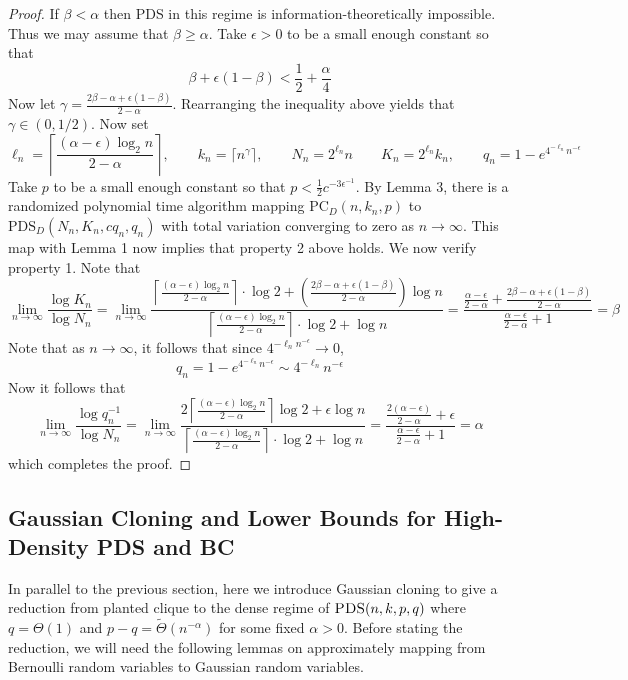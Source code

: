 \documentclass[11pt]{article}
\begin{document}
\begin{proof}
If $\beta < \alpha$ then PDS in this regime is information-theoretically impossible. Thus we may assume that $\beta \ge \alpha$. Take $\epsilon > 0$ to be a small enough constant so that
$$\beta + \epsilon(1 - \beta) < \frac{1}{2} + \frac{\alpha}{4}$$
Now let $\gamma = \frac{2\beta - \alpha + \epsilon(1 - \beta)}{2 - \alpha}$. Rearranging the inequality above yields that $\gamma \in (0, 1/2)$. Now set
$$\ell_n = \left\lceil \frac{(\alpha - \epsilon) \log_2 n}{2 - \alpha} \right\rceil, \quad \quad k_n = \lceil n^{\gamma} \rceil, \quad \quad N_n = 2^{\ell_n} n \quad \quad K_n = 2^{\ell_n} k_n, \quad \quad q_n = 1 - e^{4^{-\ell_n} n^{-\epsilon}}$$
Take $p$ to be a small enough constant so that $p < \frac{1}{2} c^{-3\epsilon^{-1}}$. By Lemma 3, there is a randomized polynomial time algorithm mapping $\text{PC}_D(n, k_n, p)$ to $\text{PDS}_D(N_n, K_n, cq_n, q_n)$ with total variation converging to zero as $n \to \infty$. This map with Lemma 1 now implies that property 2 above holds. We now verify property 1. Note that
$$\lim_{n \to \infty} \frac{\log K_n}{\log N_n} = \lim_{n \to \infty} \frac{\left\lceil \frac{(\alpha - \epsilon) \log_2 n}{2 - \alpha} \right\rceil \cdot \log 2 + \left( \frac{2\beta - \alpha + \epsilon(1 - \beta)}{2 - \alpha} \right) \log n}{\left\lceil \frac{(\alpha - \epsilon) \log_2 n}{2 - \alpha} \right\rceil\cdot \log 2 + \log n} = \frac{\frac{\alpha - \epsilon}{2 - \alpha} + \frac{2\beta - \alpha + \epsilon(1 - \beta)}{2 - \alpha}}{\frac{\alpha - \epsilon}{2 - \alpha} + 1} = \beta$$
Note that as $n \to \infty$, it follows that since $4^{-\ell_n n^{-\epsilon}} \to 0$,
$$q_n = 1 - e^{4^{-\ell_n} n^{-\epsilon}} \sim 4^{-\ell_n} n^{-\epsilon}$$
Now it follows that
$$\lim_{n \to \infty} \frac{\log q_n^{-1}}{\log N_n} = \lim_{n \to \infty} \frac{2\left\lceil \frac{(\alpha - \epsilon) \log_2 n}{2 - \alpha} \right\rceil \log 2 + \epsilon \log n}{\left\lceil \frac{(\alpha - \epsilon) \log_2 n}{2 - \alpha} \right\rceil\cdot \log 2 + \log n} = \frac{\frac{2(\alpha - \epsilon)}{2 - \alpha} + \epsilon}{\frac{\alpha - \epsilon}{2 - \alpha} + 1} = \alpha$$
which completes the proof.
\end{proof}

\subsection{Gaussian Cloning and Lower Bounds for High-Density PDS and BC}

In parallel to the previous section, here we introduce Gaussian cloning to give a reduction from planted clique to the dense regime of $\textsc{PDS}(n, k, p, q)$ where $q = \Theta(1)$ and $p - q = \tilde{\Theta}(n^{-\alpha})$ for some fixed $\alpha > 0$. Before stating the reduction, we will need the following lemmas on approximately mapping from Bernoulli random variables to Gaussian random variables.
\end{document}
